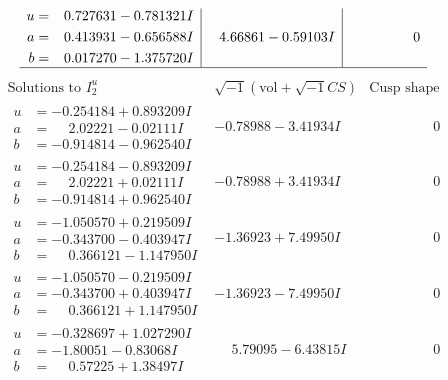 \documentclass[1p]{elsarticle_modified}
\theoremstyle{definition}
\newcommand{\I}{\sqrt{-1}}
\begin{document}
$$\begin{array}{c|c|c}
\begin{aligned}
u &= \phantom{-}0.727631 - 0.781321 I \\
a &= \phantom{-}0.413931 - 0.656588 I \\
b &= \phantom{-}0.017270 - 1.375720 I\end{aligned}
 & \phantom{-}4.66861 - 0.59103 I & \phantom{-0.000000 } 0\\
 \hline 
 \end{array}$$\newpage$$\begin{array}{c|c|c}  
\text{Solutions to }I^u_{2}& \I (\text{vol} + \sqrt{-1}CS) & \text{Cusp shape}\\
 \hline 
\begin{aligned}
u &= -0.254184 + 0.893209 I \\
a &= \phantom{-}2.02221 - 0.02111 I \\
b &= -0.914814 - 0.962540 I\end{aligned}
 & -0.78988 - 3.41934 I & \phantom{-0.000000 } 0 \\ \hline\begin{aligned}
u &= -0.254184 - 0.893209 I \\
a &= \phantom{-}2.02221 + 0.02111 I \\
b &= -0.914814 + 0.962540 I\end{aligned}
 & -0.78988 + 3.41934 I & \phantom{-0.000000 } 0 \\ \hline\begin{aligned}
u &= -1.050570 + 0.219509 I \\
a &= -0.343700 - 0.403947 I \\
b &= \phantom{-}0.366121 - 1.147950 I\end{aligned}
 & -1.36923 + 7.49950 I & \phantom{-0.000000 } 0 \\ \hline\begin{aligned}
u &= -1.050570 - 0.219509 I \\
a &= -0.343700 + 0.403947 I \\
b &= \phantom{-}0.366121 + 1.147950 I\end{aligned}
 & -1.36923 - 7.49950 I & \phantom{-0.000000 } 0 \\ \hline\begin{aligned}
u &= -0.328697 + 1.027290 I \\
a &= -1.80051 - 0.83068 I \\
b &= \phantom{-}0.57225 + 1.38497 I\end{aligned}
 & \phantom{-}5.79095 - 6.43815 I & \phantom{-0.000000 } 0 \\ \hline\begin{aligned}

\end{aligned}
\end{array}$$
\end{document}

